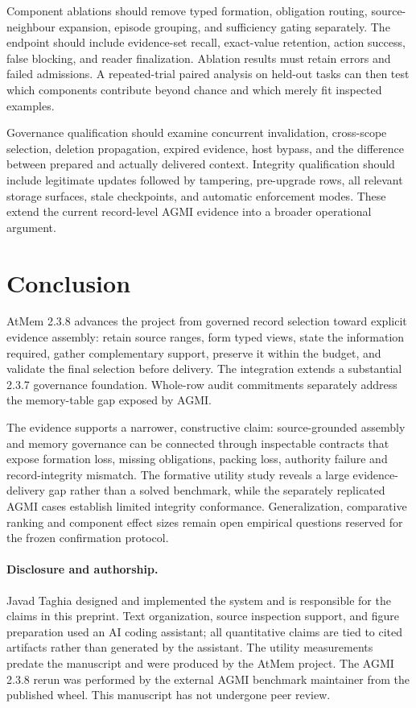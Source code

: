 \documentclass[10pt,twocolumn]{article}
\begin{document}
Component ablations should remove typed formation, obligation routing, source-neighbour expansion, episode grouping, and sufficiency gating separately. The endpoint should include evidence-set recall, exact-value retention, action success, false blocking, and reader finalization. Ablation results must retain errors and failed admissions. A repeated-trial paired analysis on held-out tasks can then test which components contribute beyond chance and which merely fit inspected examples.

Governance qualification should examine concurrent invalidation, cross-scope selection, deletion propagation, expired evidence, host bypass, and the difference between prepared and actually delivered context. Integrity qualification should include legitimate updates followed by tampering, pre-upgrade rows, all relevant storage surfaces, stale checkpoints, and automatic enforcement modes. These extend the current record-level AGMI evidence into a broader operational argument.

\section{Conclusion}
AtMem 2.3.8 advances the project from governed record selection toward explicit evidence assembly: retain source ranges, form typed views, state the information required, gather complementary support, preserve it within the budget, and validate the final selection before delivery. The integration extends a substantial 2.3.7 governance foundation. Whole-row audit commitments separately address the memory-table gap exposed by AGMI.

The evidence supports a narrower, constructive claim: source-grounded assembly and memory governance can be connected through inspectable contracts that expose formation loss, missing obligations, packing loss, authority failure and record-integrity mismatch. The formative utility study reveals a large evidence-delivery gap rather than a solved benchmark, while the separately replicated AGMI cases establish limited integrity conformance. Generalization, comparative ranking and component effect sizes remain open empirical questions reserved for the frozen confirmation protocol.

\paragraph{Disclosure and authorship.}
Javad Taghia designed and implemented the system and is responsible for the claims in this preprint. Text organization, source inspection support, and figure preparation used an AI coding assistant; all quantitative claims are tied to cited artifacts rather than generated by the assistant. The utility measurements predate the manuscript and were produced by the AtMem project. The AGMI 2.3.8 rerun was performed by the external AGMI benchmark maintainer from the published wheel. This manuscript has not undergone peer review.
\end{document}
